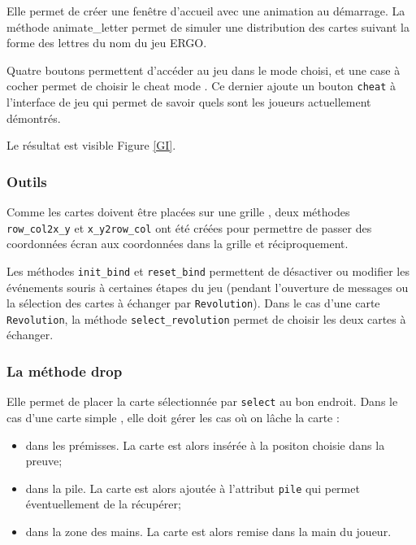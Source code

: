 \documentclass[12pt, a4paper]{article}
\begin{document}
Elle permet de créer une fenêtre d’accueil avec une animation au démarrage. La méthode animate\_letter permet de simuler une distribution des cartes suivant la forme des lettres du nom du jeu ERGO.

Quatre boutons permettent d'accéder au jeu dans le mode choisi, et une case à cocher permet de choisir le \og cheat mode \fg. Ce dernier ajoute un bouton \texttt{cheat} à l'interface de jeu qui permet de savoir quels sont les joueurs actuellement démontrés.

Le résultat est visible Figure \ref{GI}.

\subsubsection{Outils}

Comme les cartes doivent être placées sur une \og grille \fg{},  deux méthodes \texttt{row\_col2x\_y} et \texttt{x\_y2row\_col} ont été créées pour permettre de passer des coordonnées écran aux coordonnées dans la grille et réciproquement.

Les méthodes \texttt{init\_bind} et \texttt{reset\_bind} permettent de désactiver ou modifier les événements souris à certaines étapes du jeu (pendant l'ouverture de messages ou la sélection des cartes à échanger par \texttt{Revolution}). Dans le cas d'une carte \texttt{Revolution}, la méthode \texttt{select\_revolution} permet de choisir les deux cartes à échanger.

\subsubsection{La méthode drop}

Elle permet de placer la carte sélectionnée par \texttt{select} au bon endroit. Dans le cas d'une carte \og simple \fg, elle doit gérer les cas où on lâche la carte :

\begin{itemize}
\item dans les prémisses. La carte est alors insérée à la positon choisie dans la preuve;
\item dans la pile. La carte est alors ajoutée à l'attribut \texttt{pile} qui permet éventuellement de la récupérer;
\item dans la zone des mains. La carte est alors remise dans la main du joueur.
\end{itemize}
\end{document}
